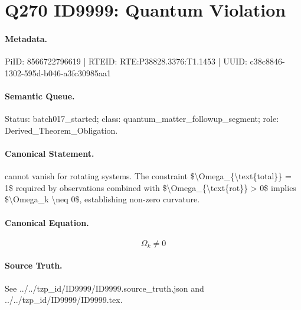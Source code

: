 \section*{Q270 ID9999: Quantum Violation}
\paragraph{Metadata.}
PiID: 8566722796619 | RTEID: RTE:P38828.3376:T1.1453 | UUID: c38c8846-1302-595d-b046-a3fc30985aa1

\paragraph{Semantic Queue.}
Status: batch017\_started; class: quantum\_matter\_followup\_segment; role: Derived\_Theorem\_Obligation.

\paragraph{Canonical Statement.}
cannot vanish for rotating systems. The constraint \$\textbackslash{}Omega\_\{\textbackslash{}text\{total\}\} = 1\$ required by observations combined with \$\textbackslash{}Omega\_\{\textbackslash{}text\{rot\}\} > 0\$ implies \$\textbackslash{}Omega\_k \textbackslash{}neq 0\$, establishing non-zero curvature.

\paragraph{Canonical Equation.}
\[
\Omega_k \neq 0
\]

\paragraph{Source Truth.}
See ../../tzp\_id/ID9999/ID9999.source\_truth.json and ../../tzp\_id/ID9999/ID9999.tex.
